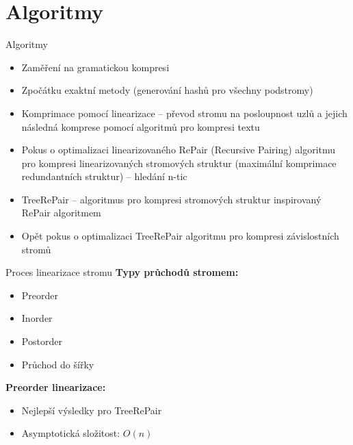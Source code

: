 \documentclass[lualatex,hyperref={pdfencoding=auto}]{beamer}
\begin{document}
\section{Algoritmy}
\begin{frame}{Algoritmy}
  \begin{itemize}
    \item Zaměření na gramatickou kompresi
    \item Zpočátku exaktní metody (generování hashů pro všechny podstromy)
    \item Komprimace pomocí linearizace -- převod stromu na posloupnost uzlů a jejich následná komprese pomocí algoritmů pro kompresi textu \nocite{McAnlis2016}
    \item Pokus o optimalizaci linearizovaného RePair (Recursive Pairing) algoritmu pro kompresi linearizovaných stromových struktur (maximální komprimace redundantních struktur) -- hledání n-tic
    \item TreeRePair -- algoritmus pro kompresi stromových struktur inspirovaný RePair algoritmem \nocite{Neubauer2010}
    \item Opět pokus o optimalizaci TreeRePair algoritmu pro kompresi závislostních stromů
  \end{itemize}
\end{frame}


\begin{frame}{Proces linearizace stromu}
      \textbf{Typy průchodů stromem:}
      \begin{itemize}
        \item Preorder 
        \item Inorder 
        \item Postorder 
        \item Průchod do šířky 
      \end{itemize}
      
      \textbf{Preorder linearizace:}
      \begin{itemize}
        \item Nejlepší výsledky pro TreeRePair
        \item Asymptotická složitost: $O(n)$
      \end{itemize}
\end{frame}
\end{document}
